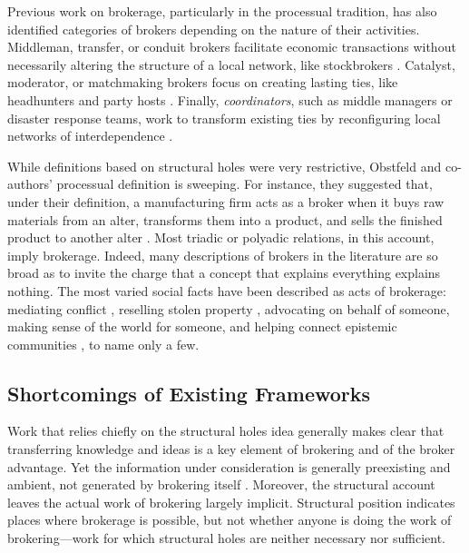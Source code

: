 \documentclass[
]{article}
\begin{document}
Previous work on brokerage, particularly in the processual tradition, has also identified categories of brokers depending on the nature of their activities. Middleman, transfer, or conduit brokers facilitate economic transactions without necessarily altering the structure of a local network, like stockbrokers \autocites[146]{stovelBrokerage2012}{spiroExtendedStructuresMediation2013}[141]{obstfeldBrokerageProcessDecoupling2014}. Catalyst, moderator, or matchmaking brokers focus on creating lasting ties, like headhunters and party hosts \autocites[146]{stovelBrokerage2012}{obstfeldBrokerageProcessDecoupling2014}{spiroExtendedStructuresMediation2013}. Finally, \emph{coordinators}, such as middle managers or disaster response teams, work to transform existing ties by reconfiguring local networks of interdependence \autocite[131-132]{spiroExtendedStructuresMediation2013}.

While definitions based on structural holes were very restrictive, Obstfeld and co-authors' processual definition is sweeping. For instance, they suggested that, under their definition, a manufacturing firm acts as a broker when it buys raw materials from an alter, transforms them into a product, and sells the finished product to another alter \autocite[145]{obstfeldBrokerageProcessDecoupling2014}. Most triadic or polyadic relations, in this account, imply brokerage. Indeed, many descriptions of brokers in the literature are so broad as to invite the charge that a concept that explains everything explains nothing. The most varied social facts have been described as acts of brokerage: mediating conflict \autocite{obstfeldBrokerageProcessDecoupling2014}, reselling stolen property \autocite{steffensmeierFenceShadowTwo1986}, advocating on behalf of someone, making sense of the world for someone, and helping connect epistemic communities \autocite[140]{stovelBrokerage2012}, to name only a few.

\subsection{Shortcomings of Existing Frameworks}

Work that relies chiefly on the structural holes idea generally makes clear that transferring knowledge and ideas is a key element of brokering and of the broker advantage. Yet the information under consideration is generally preexisting and ambient, not generated by brokering itself \autocite{burtStructuralHolesGood2004}. Moreover, the structural account leaves the actual work of brokering largely implicit. Structural position indicates places where brokerage is possible, but not whether anyone is doing the work of brokering---work for which structural holes are neither necessary nor sufficient.
\end{document}
